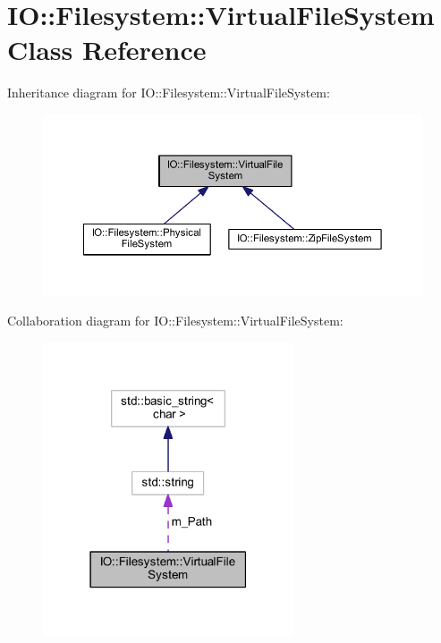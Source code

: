 \hypertarget{class_i_o_1_1_filesystem_1_1_virtual_file_system}{}\section{IO\+:\+:Filesystem\+:\+:Virtual\+File\+System Class Reference}
\label{class_i_o_1_1_filesystem_1_1_virtual_file_system}


Inheritance diagram for IO\+:\+:Filesystem\+:\+:Virtual\+File\+System\+:
\nopagebreak
\begin{figure}[H]
\begin{center}
\leavevmode
\includegraphics[width=350pt]{class_i_o_1_1_filesystem_1_1_virtual_file_system__inherit__graph}
\end{center}
\end{figure}


Collaboration diagram for IO\+:\+:Filesystem\+:\+:Virtual\+File\+System\+:
\nopagebreak
\begin{figure}[H]
\begin{center}
\leavevmode
\includegraphics[width=210pt]{class_i_o_1_1_filesystem_1_1_virtual_file_system__coll__graph}
\end{center}
\end{figure}
